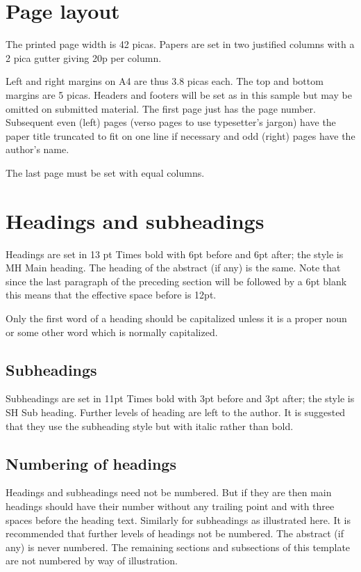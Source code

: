 \documentclass{AUJarticle}
\begin{document}
\section{Page layout}
The printed page width is 42 picas. Papers are set in two justified columns with a 2 pica gutter
giving 20p per column.

Left and right margins on A4 are thus 3.8 picas each. The top and bottom margins are 5 picas.
Headers and footers will be set as in this sample but may be omitted on submitted material. The
first page just has the page number. Subsequent even (left) pages (verso pages to use
typesetter's jargon) have the paper title truncated to fit on one line if necessary and odd
(right) pages have the author's name.

The last page must be set with equal columns.

\section{Headings and subheadings}

Headings are set in 13 pt Times bold with 6pt before and 6pt after; the style is MH Main
heading. The heading of the abstract (if any) is the same. Note that since the last paragraph of
the preceding section will be followed by a 6pt blank this means that the effective space before
is 12pt.

Only the first word of a heading should be capitalized unless it is a proper noun or some other
word which is normally capitalized.

\subsection{Subheadings}

Subheadings are set in 11pt Times bold with 3pt before and 3pt after; the style is SH Sub
heading. Further levels of heading are left to the author. It is suggested that they use the
subheading style but with italic rather than bold.

\subsection{Numbering of headings}

Headings and subheadings need not be numbered. But if they are then main headings should have
their number without any trailing point and with three spaces before the heading text. Similarly
for subheadings as illustrated here. It is recommended that further levels of headings not be
numbered. The abstract (if any) is never numbered. The remaining sections and subsections of
this template are not numbered by way of illustration.
\end{document}
